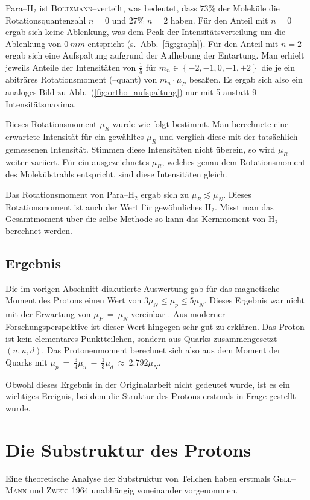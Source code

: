 \documentclass[sn-mathphys-num,iicol]{sn-jnl}
\theoremstyle{thmstyleone}
\theoremstyle{thmstyletwo}
\theoremstyle{thmstylethree}
\begin{document}
Para--$\text{H}_2$ ist \textsc{Boltzmann}--verteilt, was bedeutet, dass $73\%$ der Moleküle die Rotationsquantenzahl $n=0$ und $27\%$ $n=2$ haben.
Für den Anteil mit $n=0$ ergab sich keine Ablenkung, was dem Peak der Intensitätsverteilung um die Ablenkung von $\SI{0}{mm}$ entspricht (s.\ Abb.\ \ref{fig:graph}).
Für den Anteil mit $n=2$ ergab sich eine Aufspaltung aufgrund der Aufhebung der Entartung.
Man erhielt jeweils Anteile der Intensitäten von $\tfrac{1}{5}$ für $m_n\in\left\{-2,-1,0,+1,+2\right\}$ die je ein abiträres Rotationsmoment (--quant) von $m_n\cdot \mu _R$ besaßen.
Es ergab sich also ein analoges Bild zu Abb.\ (\ref{fig:ortho_aufspaltung}) nur mit 5 anstatt 9 Intensitätsmaxima.

Dieses Rotationsmoment $\mu _R$ wurde wie folgt bestimmt.
Man berechnete eine erwartete Intensität für ein gewähltes $\mu _R$ und verglich diese mit der tatsächlich gemessenen Intensität.
Stimmen diese Intensitäten nicht überein, so wird $\mu _R$ weiter variiert.
Für ein ausgezeichnetes $\mu _R$, welches genau dem Rotationsmoment des Molekülstrahls entspricht, sind diese Intensitäten gleich.

Das Rotationsmoment von Para--$\text{H}_2$ ergab sich zu $\mu _R\lesssim \mu _N$.
Dieses Rotationsmoment ist auch der Wert für gewöhnliches $\text{H}_2$.
Misst man das Gesamtmoment über die selbe Methode so kann das Kernmoment von $\text{H}_2$ berechnet werden.\cite{FrischStern1933}

\subsection{Ergebnis}
Die im vorigen Abschnitt diskutierte Auswertung gab für das magnetische Moment des Protons einen Wert von $3\mu _N\leq \mu _p\leq 5\mu _N$.
Dieses Ergebnis war nicht mit der Erwartung von $\mu _P~=~\mu _N$ vereinbar \cite{FrischStern1933}.
Aus moderner Forschungsperspektive ist dieser Wert hingegen sehr gut zu erklären.
Das Proton ist kein elementares Punktteilchen, sondern aus Quarks zusammengesetzt $\left(u,u,d\right)$.
Das Protonenmoment berechnet sich also aus dem Moment der Quarks mit $\mu _p~=~\tfrac{3}{4}\mu _u~-~\tfrac{1}{3}\mu _d~\approx~ 2.792\mu _N$\cite{CODATA_proton_magneton}.

Obwohl dieses Ergebnis in der Originalarbeit nicht gedeutet wurde, ist es ein wichtiges Ereignis, bei dem die Struktur des Protons erstmals in Frage gestellt wurde.

\section{Die Substruktur des Protons}
Eine theoretische Analyse der Substruktur von Teilchen haben erstmals \textsc{Gell--Mann}\cite{Gellmann1964} und \textsc{Zweig}\cite{Zweig1964} 1964 unabhängig voneinander vorgenommen.
\end{document}
